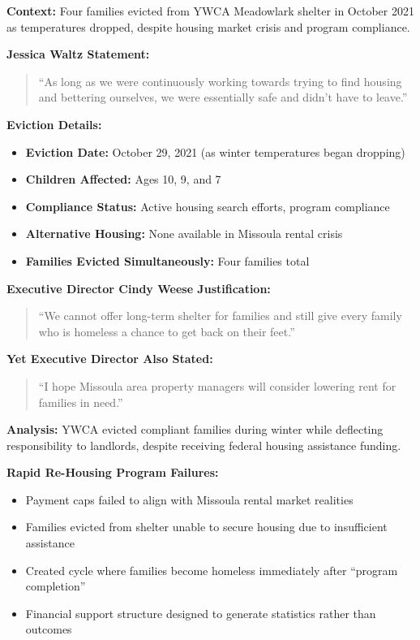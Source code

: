 \documentclass[11pt,letterpaper]{article}
\newenvironment{testimony}{%
    \begin{quote}\itshape\color{DarkGray}%
}{%
    \end{quote}%
}
\begin{document}
\textbf{Context:} Four families evicted from YWCA Meadowlark shelter in October 2021 as temperatures dropped, despite housing market crisis and program compliance.

\textbf{Jessica Waltz Statement:}
\begin{testimony}
``As long as we were continuously working towards trying to find housing and bettering ourselves, we were essentially safe and didn't have to leave.''
\end{testimony}

\textbf{Eviction Details:}
\begin{itemize}[leftmargin=*]
\item \textbf{Eviction Date:} October 29, 2021 (as winter temperatures began dropping)
\item \textbf{Children Affected:} Ages 10, 9, and 7
\item \textbf{Compliance Status:} Active housing search efforts, program compliance
\item \textbf{Alternative Housing:} None available in Missoula rental crisis
\item \textbf{Families Evicted Simultaneously:} Four families total
\end{itemize}

\textbf{Executive Director Cindy Weese Justification:}
\begin{testimony}
``We cannot offer long-term shelter for families and still give every family who is homeless a chance to get back on their feet.''
\end{testimony}

\textbf{Yet Executive Director Also Stated:}
\begin{testimony}
``I hope Missoula area property managers will consider lowering rent for families in need.''
\end{testimony}

\textbf{Analysis:} YWCA evicted compliant families during winter while deflecting responsibility to landlords, despite receiving federal housing assistance funding.

\textbf{Rapid Re-Housing Program Failures:}
\begin{itemize}[leftmargin=*]
\item Payment caps failed to align with Missoula rental market realities
\item Families evicted from shelter unable to secure housing due to insufficient assistance
\item Created cycle where families become homeless immediately after ``program completion''
\item Financial support structure designed to generate statistics rather than outcomes
\end{itemize}
\end{document}
